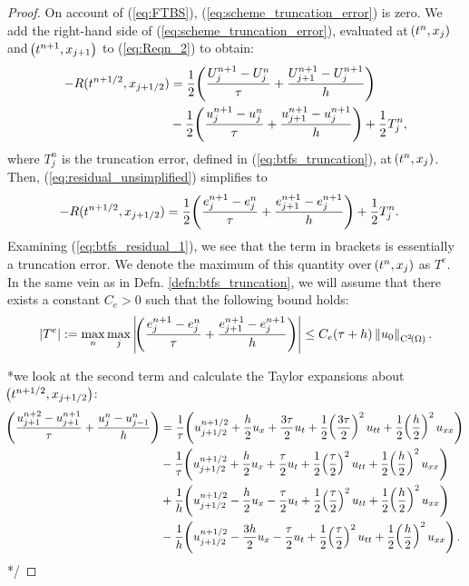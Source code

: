 \documentclass[final]{amsart}
\numberwithin{equation}{section}
\begin{document}
\begin{proof}
	On account of (\ref{eq:FTBS}), (\ref{eq:scheme_truncation_error}) is zero. We add the right-hand side of (\ref{eq:scheme_truncation_error}), evaluated at  $\!\left({t^n,x_j}\right)$ and $\!\left({t^{n+1},x_{j+1}}\right)$ to (\ref{eq:Reqn_2}) to obtain:
	\begin{equation}\label{eq:residual_unsimplified}
	\begin{aligned}
	-R(t^{n+1/2}, x_{j+1/2})&=\frac{1}{2}\!\left({\frac{U^{n+1}_j - U^n_j}{\tau}
		+
		\frac{U^{n+1}_{j+1} - U^{n+1}_{j} }{h}}\right)\\
	&-\frac{1}{2}\!\left({\frac{u^{n+1}_j-u^n_j}{\tau}
		+\frac{u^{n+1}_{j+1}-u^{n+1}_{j}}{h}}\right)
	+
	\frac{1}{2}T^n_j,
	\end{aligned}
	\end{equation}
	where  $T^n_j$ is the truncation error, defined in (\ref{eq:btfs_truncation}), at $\!\left({t^n,x_j}\right)$.
	Then, (\ref{eq:residual_unsimplified}) simplifies to 
	\begin{equation}\label{eq:btfs_residual_1}
	\begin{aligned}
	-R(t^{n+1/2}, x_{j+1/2})
	&=
	\frac{1}{2}\!\left({\frac{e^{n+1}_j - e^n_j}{\tau}	
		+
		\frac{e^{n+1}_{j+1} - e^{n+1}_{j} }{h}}\right)
	+\frac{1}{2}T^n_j.
	\end{aligned}
	\end{equation} 
	Examining (\ref{eq:btfs_residual_1}), we see that the term in brackets is essentially a truncation error.  We  denote the maximum of this quantity over $\!\left({t^n,x_j}\right)$  as $T^e$.  In the same vein as in Defn. \ref{defn:btfs_truncation}, we will assume that there exists a constant $C_e>0$ such that the following bound holds:
	\begin{equation}\label{eq:truncation_error_e}
	\left|T^e\right|:=\max_{n}\max_{j}
	\left|\!\left({\frac{e^{n+1}_j - e^n_j}{\tau}	
			+
			\frac{e^{n+1}_{j+1} - e^{n+1}_{j} }{h}}\right)\right|
	\leq
	C_e\!\left({\tau+h}\right)\left\|u_0\right\|_{\operatorname C^{2}\!\left({\Omega}\right)}.
	\end{equation}
	
	\/*we look at the second term and calculate the Taylor expansions about $\!\left({t^{n+1/2},x_{j+1/2}}\right)$:
	\begin{equation}
	\begin{aligned}
	\qp{   \frac{u^{n+2}_{j+1}-u^{n+1}_{j+1}}{\tau}+
		\frac{u^n_j-u^n_{j-1}}{h}  
	}&=\frac{1}{\tau}\qp{u^{n+1/2}_{j+1/2} +\frac{h}{2}u_x+\frac{3\tau}{2}u_t+\frac{1}{2}\qp{\frac{3\tau}{2}}^2u_{tt} +\frac{1}{2}\qp{\frac{h}{2}}^2u_{xx}}\\
	&-\frac{1}{\tau}\qp{u^{n+1/2}_{j+1/2} +\frac{h}{2}u_x+\frac{\tau}{2}u_t+\frac{1}{2}\qp{\frac{\tau}{2}}^2u_{tt} +\frac{1}{2}\qp{\frac{h}{2}}^2u_{xx}}\\
	&+\frac{1}{h}\qp{u^{n+1/2}_{j+1/2}-\frac{h}{2}u_x-\frac{\tau}{2}u_t+\frac{1}{2}\qp{\frac{\tau}{2}}^2u_{tt} +\frac{1}{2}\qp{\frac{h}{2}}^2u_{xx}}\\
	&-\frac{1}{h}\qp{u^{n+1/2}_{j+1/2}-\frac{3h}{2}u_x-\frac{\tau}{2}u_t+\frac{1}{2}\qp{\frac{\tau}{2}}^2u_{tt} +\frac{1}{2}\qp{\frac{h}{2}}^2u_{xx}}.
	\end{aligned}
	\end{equation}
	*/
	

\end{proof}
\end{document}

